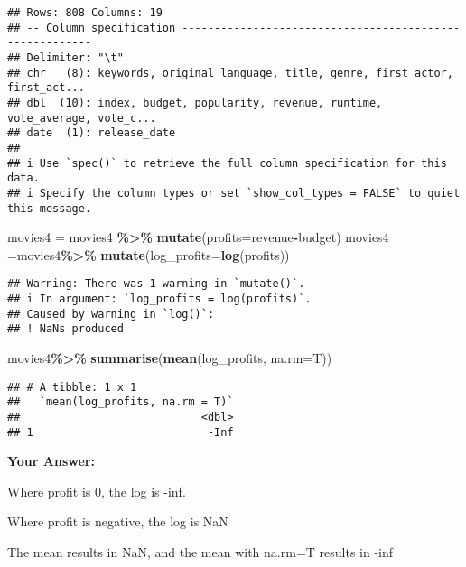 \documentclass[
]{article}
\newenvironment{Shaded}{\begin{snugshade}}{\end{snugshade}}
\newcommand{\AttributeTok}[1]{\textcolor[rgb]{0.13,0.29,0.53}{#1}}
\newcommand{\FunctionTok}[1]{\textcolor[rgb]{0.13,0.29,0.53}{\textbf{#1}}}
\newcommand{\NormalTok}[1]{#1}
\newcommand{\OtherTok}[1]{\textcolor[rgb]{0.56,0.35,0.01}{#1}}
\newcommand{\SpecialCharTok}[1]{\textcolor[rgb]{0.81,0.36,0.00}{\textbf{#1}}}
\begin{document}
\begin{verbatim}
## Rows: 808 Columns: 19
## -- Column specification --------------------------------------------------------
## Delimiter: "\t"
## chr   (8): keywords, original_language, title, genre, first_actor, first_act...
## dbl  (10): index, budget, popularity, revenue, runtime, vote_average, vote_c...
## date  (1): release_date
## 
## i Use `spec()` to retrieve the full column specification for this data.
## i Specify the column types or set `show_col_types = FALSE` to quiet this message.
\end{verbatim}

\begin{Shaded}
\begin{Highlighting}[]
\NormalTok{movies4 }\OtherTok{=}\NormalTok{ movies4 }\SpecialCharTok{\%\textgreater{}\%}
  \FunctionTok{mutate}\NormalTok{(}\AttributeTok{profits=}\NormalTok{revenue}\SpecialCharTok{{-}}\NormalTok{budget)}
\NormalTok{movies4 }\OtherTok{=}\NormalTok{movies4}\SpecialCharTok{\%\textgreater{}\%}
  \FunctionTok{mutate}\NormalTok{(}\AttributeTok{log\_profits=}\FunctionTok{log}\NormalTok{(profits))}
\end{Highlighting}
\end{Shaded}

\begin{verbatim}
## Warning: There was 1 warning in `mutate()`.
## i In argument: `log_profits = log(profits)`.
## Caused by warning in `log()`:
## ! NaNs produced
\end{verbatim}

\begin{Shaded}
\begin{Highlighting}[]
\NormalTok{movies4}\SpecialCharTok{\%\textgreater{}\%}
  \FunctionTok{summarise}\NormalTok{(}\FunctionTok{mean}\NormalTok{(log\_profits, }\AttributeTok{na.rm=}\NormalTok{T))}
\end{Highlighting}
\end{Shaded}

\begin{verbatim}
## # A tibble: 1 x 1
##   `mean(log_profits, na.rm = T)`
##                            <dbl>
## 1                           -Inf
\end{verbatim}

\textbf{Your Answer:}

Where profit is 0, the log is -inf.

Where profit is negative, the log is NaN

The mean results in NaN, and the mean with na.rm=T results in -inf
\end{document}
